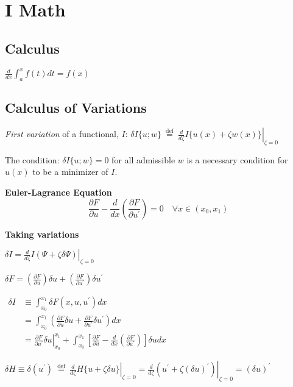 \hypertarget{i-math}{%
\section{I Math}\label{i-math}}

\hypertarget{calculus}{%
\subsection{Calculus}\label{calculus}}

\(\frac{d}{d x} \int_{a}^{x} f(t) d t=f(x)\)

\hypertarget{calculus-of-variations}{%
\subsection{Calculus of Variations}\label{calculus-of-variations}}

\emph{First variation} of a functional, \(I\):
\(\left.\delta I\{u ; w\} \stackrel{\text { def }}{=} \frac{d}{d \zeta} I\{u(x)+\zeta w(x)\}\right|_{\zeta=0}\)

The condition: \(\delta I\{u ; w\}=0\) for all admissible \(w\) is a
necessary condition for \(u(x)\) to be a minimizer of \(I\).

\textbf{Euler-Lagrance Equation}
\[\frac{\partial F}{\partial u}-\frac{d}{d x}\left(\frac{\partial F}{\partial u^{\prime}}\right)=0 \quad \forall x \in\left(x_{0}, x_{1}\right)\]

\textbf{Taking variations}

\(\delta I=\left.\frac{d}{d \zeta} I(\Psi+\zeta \delta \Psi)\right|_{\zeta=0}\)

\(\delta F=\left(\frac{\partial F}{\partial u}\right) \delta u+\left(\frac{\partial F}{\partial u^{\prime}}\right) \delta u^{\prime}\)

\(\begin{aligned} \delta I & \equiv \int_{x_{0}}^{x_{1}} \delta F\left(x, u, u^{\prime}\right) d x \\ &=\int_{x_{0}}^{x_{1}}\left(\frac{\partial F}{\partial u} \delta u+\frac{\partial F}{\partial u^{\prime}} \delta u^{\prime}\right) d x \\ &=\left.\frac{\partial F}{\partial u^{\prime}} \delta u\right|_{x_{0}} ^{x_{1}}+\int_{x_{0}}^{x_{1}}\left[\frac{\partial F}{\partial u}-\frac{d}{d x}\left(\frac{\partial F}{\partial u^{\prime}}\right)\right] \delta u d x \end{aligned}\)

\(\left.\delta H \equiv \delta\left(u^{\prime}\right) \stackrel{\text { def }}{=} \frac{d}{d \zeta} H\{u+\zeta \delta u\}\right|_{\zeta=0}=\left.\frac{d}{d \zeta}\left(u^{\prime}+\zeta(\delta u)^{\prime}\right)\right|_{\zeta=0}=(\delta u)^{\prime}\)

